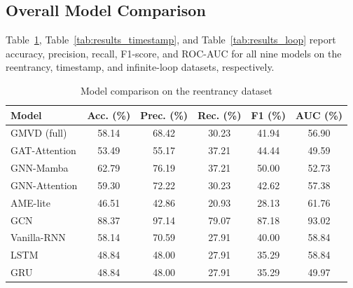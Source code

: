 \documentclass[12pt, a4paper, openright, twoside]{report}
\begin{document}
\subsection{Overall Model Comparison}

Table~\ref{tab:results_reentrancy}, Table~\ref{tab:results_timestamp}, and Table~\ref{tab:results_loop} report accuracy, precision, recall, F1-score, and ROC-AUC for all nine models on the reentrancy, timestamp, and infinite-loop datasets, respectively.

\begin{table}[htbp]
\centering
\caption{Model comparison on the reentrancy dataset}
\label{tab:results_reentrancy}
\begin{tabular}{|l|c|c|c|c|c|}
\hline
\textbf{Model} & \textbf{Acc. (\%)} & \textbf{Prec. (\%)} & \textbf{Rec. (\%)} & \textbf{F1 (\%)} & \textbf{AUC (\%)} \\ \hline
GMVD (full)     & 58.14 & 68.42 & 30.23 & 41.94 & 56.90 \\ \hline
GAT-Attention   & 53.49 & 55.17 & 37.21 & 44.44 & 49.59 \\ \hline
GNN-Mamba       & 62.79 & 76.19 & 37.21 & 50.00 & 52.73 \\ \hline
GNN-Attention   & 59.30 & 72.22 & 30.23 & 42.62 & 57.38 \\ \hline
AME-lite        & 46.51 & 42.86 & 20.93 & 28.13 & 61.76 \\ \hline
GCN             & 88.37 & 97.14 & 79.07 & 87.18 & 93.02 \\ \hline
Vanilla-RNN     & 58.14 & 70.59 & 27.91 & 40.00 & 58.84 \\ \hline
LSTM            & 48.84 & 48.00 & 27.91 & 35.29 & 58.84 \\ \hline
GRU             & 48.84 & 48.00 & 27.91 & 35.29 & 49.97 \\ \hline
\end{tabular}
\end{table}
\end{document}
